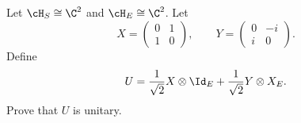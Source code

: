 Let $\cH_S\cong\C^2$ and $\cH_E\cong\C^2$. Let
$$
X=
\begin{pmatrix}
0&1\\
1&0
\end{pmatrix},
\qquad
Y=
\begin{pmatrix}
0&-i\\
i&0
\end{pmatrix}.
$$
Define
$$
U=
\frac{1}{\sqrt{2}}X\otimes\Id_E
+
\frac{1}{\sqrt{2}}Y\otimes X_E.
$$
Prove that $U$ is unitary.
